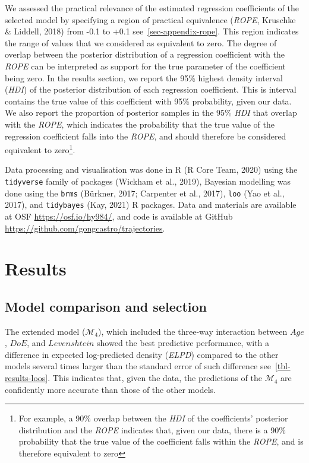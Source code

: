 \documentclass[
  letterpaper,
  DIV=11,
  numbers=noendperiod]{scrartcl}
\begin{document}
We assessed the practical relevance of the estimated regression
coefficients of the selected model by specifying a region of practical
equivalence (\emph{ROPE}, Kruschke \& Liddell, 2018) from -0.1 to +0.1
see~\ref{sec-appendix-rope}. This region indicates the range of values
that we considered as equivalent to zero. The degree of overlap between
the posterior distribution of a regression coefficient with the
\emph{ROPE} can be interpreted as support for the true parameter of the
coefficient being zero. In the results section, we report the 95\%
highest density interval (\emph{HDI}) of the posterior distribution of
each regression coefficient. This is interval contains the true value of
this coefficient with 95\% probability, given our data. We also report
the proportion of posterior samples in the 95\% \emph{HDI} that overlap
with the \emph{ROPE}, which indicates the probability that the true
value of the regression coefficient falls into the \emph{ROPE}, and
should therefore be considered equivalent to zero\footnote{For example,
  a 90\% overlap between the \emph{HDI} of the coefficients' posterior
  distribution and the \emph{ROPE} indicates that, given our data, there
  is a 90\% probability that the true value of the coefficient falls
  within the \emph{ROPE}, and is therefore equivalent to zero}.

Data processing and visualisation was done in R (R Core Team, 2020)
using the \texttt{tidyverse} family of packages (Wickham et al., 2019),
Bayesian modelling was done using the \texttt{brms} (Bürkner, 2017;
Carpenter et al., 2017), \texttt{loo} (Yao et al., 2017), and
\texttt{tidybayes} (Kay, 2021) R packages. Data and materials are
available at OSF \url{https://osf.io/hy984/}, and code is available at
GitHub \url{https://github.com/gongcastro/trajectories}.

\hypertarget{sec-results}{%
\section{Results}\label{sec-results}}

\hypertarget{sec-comparison}{%
\subsection{Model comparison and selection}\label{sec-comparison}}

The extended model (\(\mathcal{M}_{4}\)), which included the three-way
interaction between \(Age\), \(DoE\), and \(Levenshtein\) showed the
best predictive performance, with a difference in expected log-predicted
density (\emph{ELPD}) compared to the other models several times larger
than the standard error of such difference see~\ref{tbl-results-loos}.
This indicates that, given the data, the predictions of the
\(\mathcal{M}_{4}\) are confidently more accurate than those of the
other models.
\end{document}

